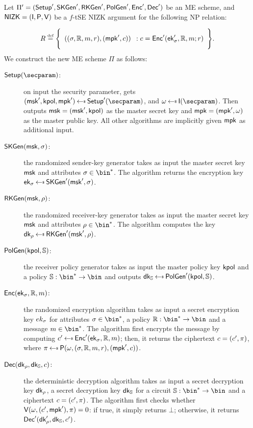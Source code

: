 \begin{construction}\label{constr:me_nizk_priv}
    Let $\Pi'=(\mathsf{Setup}',\mathsf{SKGen}',\mathsf{RKGen}', \mathsf{PolGen}', \mathsf{Enc}',\mathsf{Dec}')$ be an ME scheme, and $\mathsf{NIZK}=(\mathsf{I},\mathsf{P},\mathsf{V})$ be a $f$-tSE NIZK argument for the following NP relation:

    \[
        R \eqdef \Biggl\{ \begin{array}{c}((\sattr, \raccess, \msg, r),(\mpk',\cipher))\end{array}:\begin{array}{@{}c}
            \cipher = \enc'(\ek'_\sattr, \raccess, \msg; r)
        \end{array} \Biggr\}.
    \]
    \newline\newline
    We construct the new ME scheme $\Pi$ as follows:
    \begin{description}
        \item[$\setup(\secparam)$:] on input the security parameter, gets $(\msk', \kpol, \mpk') \getsr \setup'(\secparam)$, and $\crs \getsr \init(\secparam)$. Then outputs $\mathsf{msk} = (\mathsf{msk}', \mathsf{kpol})$ as the master secret key and $\mathsf{mpk} = (\mathsf{mpk}', \omega)$ as the master public key. All other algorithms are implicitly given $\mathsf{mpk}$ as additional input.
        \item[$\mathsf{SKGen}(\mathsf{msk}, \sigma)$:] the randomized sender-key generator takes as input the master secret key $\mathsf{msk}$ and attributes $\sattr \in \bin^*$. The algorithm returns the encryption key $\ek_\sattr \getsr \skgen'(\msk', \sattr)$.
        \item[$\mathsf{RKGen}(\mathsf{msk}, \rho)$:] the randomized receiver-key generator takes as input the master secret key $\mathsf{msk}$ and attributes $\rattr \in \bin^*$. The algorithm computes the key $\dk_\rattr \getsr \rkgen'(\msk', \rattr)$.
        \item[$\mathsf{PolGen}(\mathsf{kpol}, \mathbb{S})$:] the receiver policy generator takes as input the master policy key $\mathsf{kpol}$ and a policy $\saccess: \bin^* \to \bin$ and outputs $\dk_\saccess \getsr \polgen'(\kpol, \saccess)$.
        \item[$\mathsf{Enc}(\mathsf{ek}_\sigma, \mathbb{R}, m)$:] the randomized encryption algorithm takes as input a secret encryption key $ek_\sigma$ for attributes $\sattr \in \bin^*$, a policy $\raccess: \bin^* \to \bin$ and a message $\msg \in \bin^*$. The algorithm first encrypts the message by computing $\cipher' \getsr \enc'(\ek_\sattr, \raccess, \msg)$; then, it returns the ciphertext $c = (c', \pi)$, where $\pi \getsr \prover(\crs, (\sattr, \raccess, \msg, r),(\mpk', \cipher))$.
        \item[$\mathsf{Dec}(\mathsf{dk}_\rho, \mathsf{dk}_{\mathbb{S}}, c)$:] the deterministic decryption algorithm takes as input a secret decryption key $\mathsf{dk}_\rho$, a secret decryption key $\mathsf{dk}_{\mathbb{S}}$ for a circuit $\saccess: \bin^* \to \bin$ and a ciphertext $c = (c', \pi)$. The algorithm first checks whether $\mathsf{V}(\omega, (c', \mathsf{mpk}'), \pi) = 0$: if true, it simply returns $\bot$; otherwise, it returns $\mathsf{Dec}'(\mathsf{dk}'_\rho, \mathsf{dk}_{\mathbb{S}}, c')$.
    \end{description}
\end{construction}